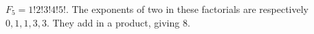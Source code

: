 $F_5=1!2!3!4!5!$. The exponents of two in these factorials are respectively $0,1,1,3,3$. They add in a product, giving $\boxed 8$.
